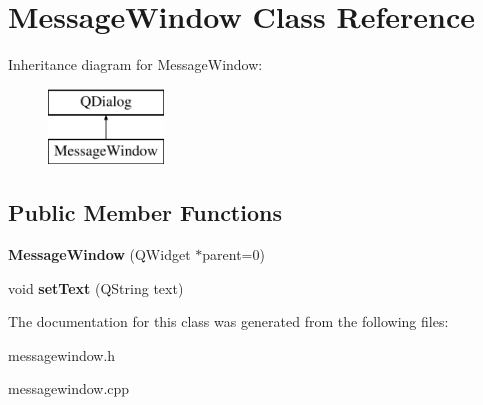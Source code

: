 \hypertarget{class_message_window}{}\section{Message\+Window Class Reference}
\label{class_message_window}
Inheritance diagram for Message\+Window\+:\begin{figure}[H]
\begin{center}
\leavevmode
\includegraphics[height=2.000000cm]{class_message_window}
\end{center}
\end{figure}
\subsection*{Public Member Functions}
\begin{DoxyCompactItemize}
\item 
\mbox{\label{class_message_window_a2dd830772844f8452d65d93f176275ae}} 
{\bfseries Message\+Window} (Q\+Widget $\ast$parent=0)
\item 
\mbox{\label{class_message_window_a45224be381e16f8f8651d8ab51487043}} 
void {\bfseries set\+Text} (Q\+String text)
\end{DoxyCompactItemize}


The documentation for this class was generated from the following files\+:\begin{DoxyCompactItemize}
\item 
messagewindow.\+h\item 
messagewindow.\+cpp\end{DoxyCompactItemize}
